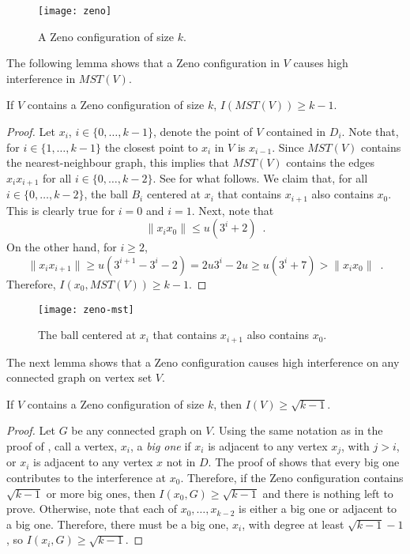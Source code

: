 \documentclass{cccg12}
\newcommand{\mst}{\mathit{MST}}
\begin{document}
\begin{figure*}
  \begin{center}
    \texttt{[image: zeno]}
  \end{center}
  \caption{A Zeno configuration of size $k$.}
\end{figure*}


The following lemma shows that a Zeno configuration in $V$ causes high
interference in $\mst(V)$.

\begin{lem}
If $V$ contains a Zeno configuration of size $k$, $I(\mst(V))\ge k-1$.
\end{lem}

\begin{proof}
Let $x_i$, $i\in\{0,\ldots,k-1\}$, denote the point of $V$ contained in
$D_i$.  Note that, for $i\in\{1,\ldots,k-1\}$ the closest point to $x_i$
in $V$ is $x_{i-1}$.  Since $\mst(V)$ contains the nearest-neighbour
graph, this implies that $\mst(V)$ contains the edges $x_ix_{i+1}$ for
all $i\in\{0,\ldots,k-2\}$.  See  for what follows.
We claim that, for all $i\in\{0,\ldots,k-2\}$, the ball $B_i$ centered
at $x_i$ that contains $x_{i+1}$ also contains $x_0$.  This is clearly
true for $i=0$ and $i=1$.  Next, note that
\[
  \|x_ix_0\| \le u(3^i+2) \enspace .
\]
On the other hand, for $i\ge 2$,
\[
  \|x_ix_{i+1}\| \ge u(3^{i+1}-3^i-2) = 2u3^i-2u \ge u(3^i + 7) > 
\|x_ix_0\| \enspace .
\]
Therefore, $I(x_0,\mst(V)) \ge k-1$.
\end{proof}

\begin{figure}
  \begin{center}
    \texttt{[image: zeno-mst]}
  \end{center}
  \caption{The ball centered at $x_i$ that contains $x_{i+1}$ also contains $x_0$.}
\end{figure}

The next lemma shows that a Zeno configuration causes high interference on
any connected graph on vertex set $V$.

\begin{lem}
If $V$ contains a Zeno configuration of size $k$, then $I(V)\ge\sqrt{k-1}$.
\end{lem}

\begin{proof}
Let $G$ be any connected graph on $V$.  Using the same notation as
in the proof of , call a vertex, $x_i$, a \emph{big
one} if $x_i$ is adjacent to any vertex $x_j$, with $j>i$, or $x_i$ is
adjacent to any vertex $x$ not in $D$.  The proof of 
shows that every big one contributes to the interference at $x_0$.
Therefore, if the Zeno configuration contains $\sqrt{k-1}$ or more big
ones, then $I(x_0,G)\ge\sqrt{k-1}$ and there is nothing left to prove.
Otherwise, note that each of $x_0,\ldots,x_{k-2}$ is either a big one
or adjacent to a big one. Therefore, there must be a big one, $x_i$,
with degree at least $\sqrt{k-1}-1$, so $I(x_i,G)\ge\sqrt{k-1}$.
\end{proof}
\end{document}
